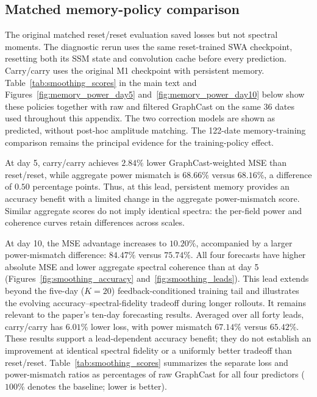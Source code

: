 \documentclass{article}
\newcommand{\vfourred}[1]{{\color{red}#1}}
\begin{document}
\FloatBarrier
\subsection{\vfourred{Matched memory-policy comparison}}
\label{app:smoothing_reset}

\vfourred{The original matched reset/reset evaluation saved losses but not spectral moments. The diagnostic rerun uses the same reset-trained SWA checkpoint, resetting both its SSM state and convolution cache before every prediction. Carry/carry uses the original M1 checkpoint with persistent memory. Table~\ref{tab:smoothing_scores} in the main text and Figures~\ref{fig:memory_power_day5} and~\ref{fig:memory_power_day10} below show these policies together with raw and filtered GraphCast on the same 36 dates used throughout this appendix. The two correction models are shown as predicted, without post-hoc amplitude matching. The 122-date memory-training comparison remains the principal evidence for the training-policy effect.}

\vfourred{At day 5, carry/carry achieves $2.84\%$ lower GraphCast-weighted MSE than reset/reset, while aggregate power mismatch is $68.66\%$ versus $68.16\%$, a difference of $0.50$ percentage points. Thus, at this lead, persistent memory provides an accuracy benefit with a limited change in the aggregate power-mismatch score. Similar aggregate scores do not imply identical spectra: the per-field power and coherence curves retain differences across scales.}

\vfourred{At day 10, the MSE advantage increases to $10.20\%$, accompanied by a larger power-mismatch difference: $84.47\%$ versus $75.74\%$. All four forecasts have higher absolute MSE and lower aggregate spectral coherence than at day 5 (Figures~\ref{fig:smoothing_accuracy} and~\ref{fig:smoothing_leads}). This lead extends beyond the five-day ($K=20$) feedback-conditioned training tail and illustrates the evolving accuracy--spectral-fidelity tradeoff during longer rollouts. It remains relevant to the paper's ten-day forecasting results. Averaged over all forty leads, carry/carry has $6.01\%$ lower loss, with power mismatch $67.14\%$ versus $65.42\%$. These results support a lead-dependent accuracy benefit; they do not establish an improvement at identical spectral fidelity or a uniformly better tradeoff than reset/reset. Table~\ref{tab:smoothing_scores} summarizes the separate loss and power-mismatch ratios as percentages of raw GraphCast for all four predictors ($100\%$ denotes the baseline; lower is better).}
\end{document}
